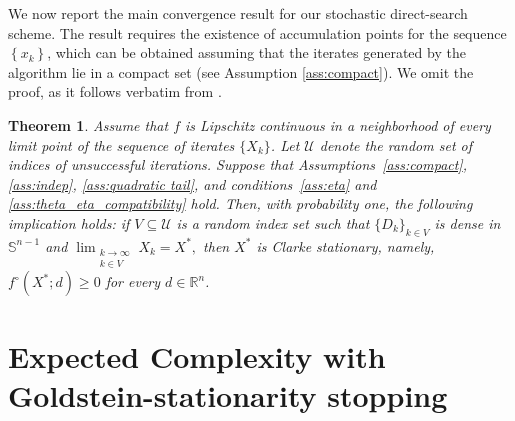 \documentclass[11pt,a4paper]{article}
\newtheorem{theorem}{Theorem}[section]
\newenvironment{proof}[1][Proof]{%
  \par\noindent\textbf{#1.}\ %
}{%
  \par\vspace{-0.5 ex}            %
  \noindent\hfill\rule{0.5em}{0.5em}\par
  \vspace{1ex}
}
\begin{document}
We now report the main convergence result for our stochastic direct-search scheme. The result requires the existence of accumulation points for the sequence $\left\{x_{k}\right\}$, which can be obtained assuming that the iterates generated by the algorithm lie in a compact set (see Assumption \ref{ass:compact}). We omit the proof, as it follows verbatim from \cite[Theorem 3.3]{MR4758401}.
\begin{theorem}
Assume that \(f\) is Lipschitz continuous in a
neighborhood of every limit point of the sequence of iterates
\(\{X_k\}\). Let \(\mathcal U\) denote the random set of indices of
unsuccessful iterations. Suppose that
Assumptions~\ref{ass:compact}, \ref{ass:indep},
\ref{ass:quadratic tail}, and conditions~\eqref{ass:eta} and
\eqref{ass:theta_eta_compatibility} hold.
Then, with probability one, the following implication holds: if
\(V\subseteq\mathcal U\) is a random index set such that
\(\{D_k\}_{k\in V}\) is dense in \(\mathbb S^{n-1}\) and
\(
    \lim_{\substack{k\to\infty\\ k\in V}} X_k = X^*,
\)
then \(X^*\) is Clarke stationary, namely,
\(
    f^\circ(X^*;d)\ge0
\) for every $d\in\mathbb R^n$.
\end{theorem} 

% 

% 
\section{Expected Complexity with Goldstein-stationarity stopping}\label{sec:clarke complexity}
\end{document}
